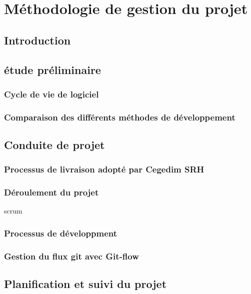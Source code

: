 \section{Méthodologie de gestion du projet}
\subsection{Introduction}
\subsection{étude préliminaire}
\subsubsection{Cycle de vie de logiciel}
\subsubsection{Comparaison des différents méthodes de développement}
\subsection{Conduite de projet}
\subsubsection{Processus de livraison adopté par Cegedim SRH}
\subsubsection{Déroulement du projet}
scrum
\subsubsection{Processus de développment}
\subsubsection{Gestion du flux git avec Git-flow}
\subsection{Planification et suivi du projet}
